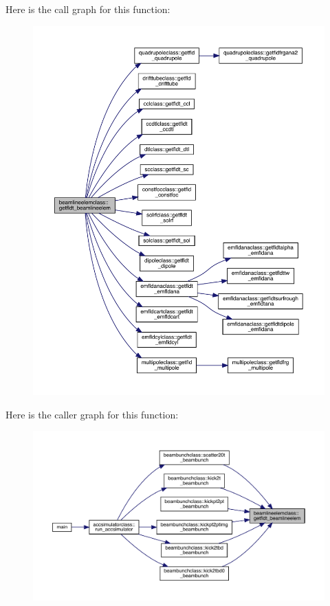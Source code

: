 Here is the call graph for this function\+:\nopagebreak
\begin{figure}[H]
\begin{center}
\leavevmode
\includegraphics[width=350pt]{namespacebeamlineelemclass_a99175508a57a532d040552a0a72bdcc1_cgraph}
\end{center}
\end{figure}
Here is the caller graph for this function\+:\nopagebreak
\begin{figure}[H]
\begin{center}
\leavevmode
\includegraphics[width=350pt]{namespacebeamlineelemclass_a99175508a57a532d040552a0a72bdcc1_icgraph}
\end{center}
\end{figure}
\mbox{\label{namespacebeamlineelemclass_a52595a459a442685b5ab427a2fdb27c8}} 
